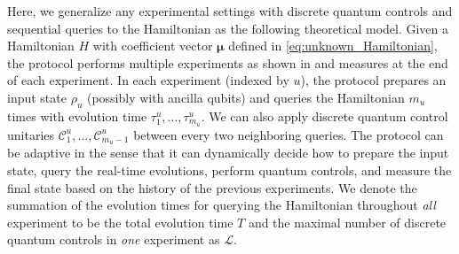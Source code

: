 \documentclass[twocolumn,superscriptaddress,aps,showpacs,amsmath,amstex,amssymb,citeautoscript,floatfix,pra,preprintnumbers]{revtex4-2}
\theoremstyle{plain}
\theoremstyle{plain}
\theoremstyle{plain}
\theoremstyle{plain}
\theoremstyle{plain}
\theoremstyle{plain}
\begin{document}
\begin{appendix}
Here, we generalize any experimental settings with discrete quantum controls and sequential queries to the Hamiltonian as the following theoretical model. 
Given a Hamiltonian $H$ with coefficient vector $\bm{\mu}$ defined in \eqref{eq:unknown_Hamiltonian}, the protocol performs multiple experiments as shown in  and measures at the end of each experiment.
In each experiment (indexed by $u$), the protocol prepares an input state $\rho_u$ (possibly with ancilla qubits) and queries the Hamiltonian $m_u$ times with evolution time $\tau_1^u,...,\tau_{m_u}^u$. We can also apply discrete quantum control unitaries $\mathcal{C}_1^u,...,\mathcal{C}_{m_u-1}^{u}$ between every two neighboring queries.
The protocol can be adaptive in the sense that it can dynamically decide how to prepare the input state, query the real-time evolutions, perform quantum controls, and measure the final state based on the history of the previous experiments.
We denote the summation of the evolution times for querying the Hamiltonian throughout \emph{all} experiment to be the total evolution time $T$ and the maximal number of discrete quantum controls in \emph{one} experiment as $\mathcal{L}$.


\end{appendix}
\end{document}
